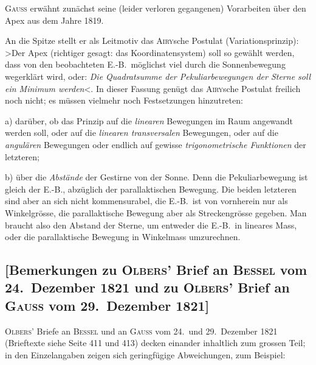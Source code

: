 \documentclass[12pt,a4paper]{article}
\theoremstyle{plain}
\theoremstyle{definition}
\theoremstyle{remark}
\begin{document}
\begin{small}
\textsc{Gauss} erw\"ahnt zun\"achst seine (leider verloren gegangenen) Vorarbeiten \"uber
den Apex aus dem Jahre 1819.

An die Spitze stellt er als Leitmotiv das \textsc{Airy}sche Postulat (Variationsprinzip):
\textgreater{}Der Apex (richtiger gesagt: das Koordinatensystem) soll so gew\"ahlt werden,
dass von den beobachteten E.-B.~m\"oglichst viel durch die Sonnenbewegung wegerkl\"art
wird, oder: \textit{Die Quadratsumme der Pekuliarbewegungen der Sterne soll ein Minimum
werden}\textless{}. In dieser Fassung gen\"ugt das \textsc{Airy}sche Postulat freilich noch nicht;
es m\"ussen vielmehr noch Festsetzungen hinzutreten:

a) dar\"uber, ob das Prinzip auf die \textit{linearen} Bewegungen im Raum angewandt
werden soll, oder auf die \textit{linearen transversalen} Bewegungen, oder auf die
\textit{angul\"aren} Bewegungen oder endlich auf gewisse \textit{trigonometrische Funktionen}
der letzteren;

b) \"uber die \textit{Abst\"ande} der Gestirne von der Sonne. Denn die Pekuliarbewegung
ist gleich der E.-B., abz\"uglich der parallaktischen Bewegung. Die beiden letzteren
sind aber an sich nicht kommensurabel, die E.-B.~ist von vornherein nur als
Winkelgr\"osse, die parallaktische Bewegung aber als Streckengr\"osse gegeben. Man
braucht also den Abstand der Sterne, um entweder die E.-B.~in lineares Mass,
oder die parallaktische Bewegung in Winkelmass umzurechnen.
\end{small}

\subsection*{[Bemerkungen zu \textsc{Olbers'} Brief an \textsc{Bessel} vom 24.~Dezember 1821 und
zu \textsc{Olbers'} Brief an \textsc{Gauss} vom 29.~Dezember 1821]}

\begin{small}
\textsc{Olbers'} Briefe an \textsc{Bessel} und an \textsc{Gauss} vom 24.~und 29.~Dezember 1821
(Brieftexte siehe Seite 411 und 413) decken einander inhaltlich zum grossen Teil;
in den Einzelangaben zeigen sich geringf\"ugige Abweichungen, zum Beispiel:
\end{small}
\end{document}
